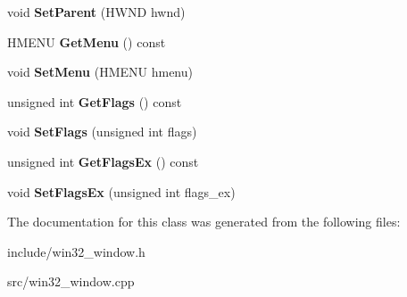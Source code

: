 \begin{DoxyCompactItemize}
void {\bfseries Set\+Parent} (H\+W\+ND hwnd)
\item 
\mbox{\label{class_blade_1_1_win32_window_ae183e854dcbc45c34fe91404ff5ec5ee}} 
H\+M\+E\+NU {\bfseries Get\+Menu} () const
\item 
\mbox{\label{class_blade_1_1_win32_window_afa510c25b39e554fe90309c318428e1d}} 
void {\bfseries Set\+Menu} (H\+M\+E\+NU hmenu)
\item 
\mbox{\label{class_blade_1_1_win32_window_a5af0fbd5f5a71c689df231fbd9dba8ee}} 
unsigned int {\bfseries Get\+Flags} () const
\item 
\mbox{\label{class_blade_1_1_win32_window_af93444b729b4534864687471148afa44}} 
void {\bfseries Set\+Flags} (unsigned int flags)
\item 
\mbox{\label{class_blade_1_1_win32_window_a85c00cd3300aba9bd5e1711ccb49983f}} 
unsigned int {\bfseries Get\+Flags\+Ex} () const
\item 
\mbox{\label{class_blade_1_1_win32_window_a714b073cabbd9436aaceaa0d02482746}} 
void {\bfseries Set\+Flags\+Ex} (unsigned int flags\+\_\+ex)
\end{DoxyCompactItemize}


The documentation for this class was generated from the following files\+:\begin{DoxyCompactItemize}
\item 
include/win32\+\_\+window.\+h\item 
src/win32\+\_\+window.\+cpp\end{DoxyCompactItemize}
